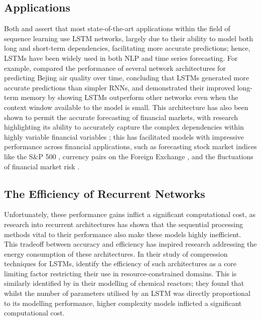 \documentclass[a4paper, 11pt]{report}
\begin{document}
    \subsection{Applications}

    Both \citet{lipton-2015} and \citet{yu-2019} assert that most state-of-the-art applications within the field of sequence learning use LSTM networks, largely due to their ability to model both long and short-term dependencies, facilitating more accurate predictions; hence, LSTMs have been widely used in both NLP and time series forecasting. For example, \citet{shi-2022} compared the performance of several network architectures for predicting Bejing air quality over time, concluding that LSTMs generated more accurate predictions than simpler RNNs, and demonstrated their improved long-term memory by showing LSTMs outperform other networks even when the context window available to the model is small. This architecture has also been shown to permit the accurate forecasting of financial markets, with research highlighting its ability to accurately capture the complex dependencies within highly variable financial variables \citep{li-2017}; this has facilitated models with impressive performance across financial applications, such as forecasting stock market indices like the S\&P 500 \citep{fjellstrom-2022}, currency pairs on the Foreign Exchange \citep{qi-2021}, and the fluctuations of financial market risk \citep{du-2019}.


    \subsection{The Efficiency of Recurrent Networks}

    Unfortunately, these performance gains inflict a significant computational cost, as research into recurrent architectures has shown that the sequential processing methods vital to their performance also make these models highly inefficient. This tradeoff between accuracy and efficiency has inspired research addressing the energy consumption of these architectures. In their study of compression techniques for LSTMs, \citet{wang-2018} identify the efficiency of such architectures as a core limiting factor restricting their use in resource-constrained domains. This is similarly identified by \citet{zarzycki-2021} in their modelling of chemical reactors; they found that whilst the number of parameters utilised by an LSTM was directly proportional to its modelling performance, higher complexity models inflicted a significant computational cost. 
\end{document}
